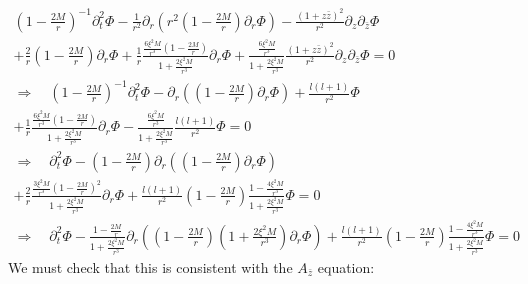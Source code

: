 \documentclass[12pt]{article}
\def\nn{\nonumber}
\begin{document}
\begin{gather}
(1 - \frac{2 M}{r})^{-1}
\partial^{2}_{t}
\Phi
-
\frac{1}{r^{2}}
\partial_{r}
\left(
r^{2} (1 - \frac{2 M}{r})
\partial_{r}
\Phi
\right)
-
\frac{(1 + z \bar{z})^{2}}{r^{2}}
\partial_{z}\partial_{\bar{z}}\Phi
\nn \\
+
\frac{2}{r}
(1 - \frac{2 M}{r})
\partial_{r}
\Phi
+
\frac{1}{r}
\frac{\frac{6 \xi^{2} M}{r^{3}} (1 - \frac{2 M}{r}) }{1 + \frac{2 \xi^{2} M}{r^{3}}}
\partial_{r} \Phi
+
\frac{\frac{6 \xi^{2} M}{r^{3}} }{1 + \frac{2 \xi^{2} M}{r^{3}}}
\frac{(1 + z \bar{z})^{2}}{r^{2}}
\partial_{z}\partial_{\bar{z}}\Phi
=0
\nn \\
\Rightarrow
\quad
(1 - \frac{2 M}{r})^{-1}
\partial^{2}_{t}
\Phi
-
\partial_{r}
\left(
(1 - \frac{2 M}{r})
\partial_{r}
\Phi
\right)
+
\frac{l (l + 1)}{r^{2}}
\Phi
\nn \\
+
\frac{1}{r}
\frac{\frac{6 \xi^{2} M}{r^{3}} (1 - \frac{2 M}{r}) }{1 + \frac{2 \xi^{2} M}{r^{3}}}
\partial_{r} \Phi
-
\frac{\frac{6 \xi^{2} M}{r^{3}} }{1 + \frac{2 \xi^{2} M}{r^{3}}}
\frac{l (l + 1)}{r^{2}}
\Phi
=0
\nn \\
\Rightarrow
\quad
\partial^{2}_{t}
\Phi
-
(1 - \frac{2 M}{r})
\partial_{r}
\left(
(1 - \frac{2 M}{r})
\partial_{r}
\Phi
\right)
\nn \\
+
\frac{2}{r}
\frac{\frac{3 \xi^{2} M}{r^{3}} (1 - \frac{2 M}{r})^{2} }{1 + \frac{2 \xi^{2} M}{r^{3}}}
\partial_{r} \Phi
+
\frac{l (l + 1)}{r^{2}}
(1 - \frac{2 M}{r})
\frac{1 - \frac{4  \xi^{2} M}{r^{3}} }{1 + \frac{2 \xi^{2} M}{r^{3}}}
\Phi
=0
\nn \\
\Rightarrow
\quad
\partial^{2}_{t}
\Phi
-
\frac{1 - \frac{2 M}{r}}{1 + \frac{2 \xi^{2} M}{r^{3}}}
\partial_{r}
\left(
(1 - \frac{2 M}{r})
(1 + \frac{2 \xi^{2} M}{r^{3}})
\partial_{r}
\Phi
\right)
+
\frac{l (l + 1)}{r^{2}}
(1 - \frac{2 M}{r})
\frac{1 - \frac{4  \xi^{2} M}{r^{3}} }{1 + \frac{2 \xi^{2} M}{r^{3}}}
\Phi
=0
\end{gather}
We must check that this is consistent with the $A_{\bar{z}}$ equation:
\end{document}
